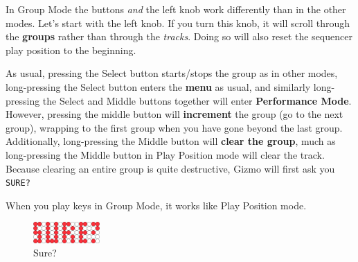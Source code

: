 \documentclass{article}
\begin{document}
In Group Mode the buttons {\it and} the left knob work differently than in the other modes.  Let's start with the left knob.  If you turn this knob, it will scroll through the {\bf groups} rather than through the {\it tracks}.  Doing so will also reset the sequencer play position to the beginning.  %


As usual, pressing the Select button starts/stops the group as in other modes, long-pressing the Select button enters the {\bf menu} as usual, and similarly long-pressing the Select and Middle buttons together will enter {\bf Performance Mode}.  However, pressing the middle button will {\bf increment} the group (go to the next group), wrapping to the first group when you have gone beyond the last group.  Additionally, long-pressing the Middle button will {\bf clear the group}, much as long-pressing the Middle button in Play Position mode will clear the track.  Because clearing an entire group is quite destructive, Gizmo will first ask you {\tt SURE?}


When you play keys in Group Mode, it works like Play Position mode.

\begin{figure}
\vspace{-1em}
\includegraphics[width=1in]{sure.pdf}
\caption{Sure?}
\label{exit}
\vspace{-1em}
\end{figure}
\end{document}
